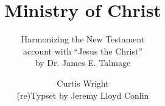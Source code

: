 \documentclass[8pt]{scrartcl}
\title{Ministry of Christ}
\subtitle{Harmonizing the New Testament\\ account with ``Jesus the Christ''\\ by Dr. James E. Talmage}
\author{\Huge Curtis Wright\\\small (re)Typset by Jeremy Lloyd Conlin}
\date{}
\begin{document}
\pagestyle{empty}
\maketitle


\begin{landscape}

\end{landscape}
\end{document}
